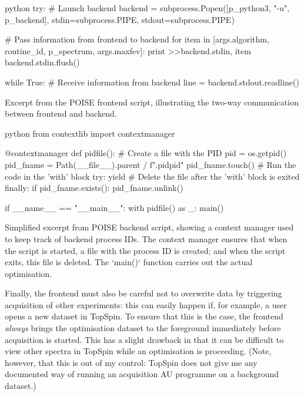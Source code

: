 \begin{mylisting}[htb]
\begin{tcbminted}{python}
try:
    # Launch backend
    backend = subprocess.Popen([p_python3, "-u", p_backend],
                               stdin=subprocess.PIPE,
                               stdout=subprocess.PIPE)

    # Pass information from frontend to backend
    for item in [args.algorithm, routine_id, p_spectrum, args.maxfev]:
        print >>backend.stdin, item
    backend.stdin.flush()

    while True:
        # Receive information from backend
        line = backend.stdout.readline()
\end{tcbminted}
    \caption[Communication between frontend and backend in POISE]{Excerpt from the POISE frontend script, illustrating the two-way communication between frontend and backend.}
    \label{lst:poise_communication}
\end{mylisting}

\begin{mylisting}[htb]
\begin{tcbminted}{python}
from contextlib import contextmanager

@contextmanager
def pidfile():
    # Create a file with the PID
    pid = os.getpid()
    pid_fname = Path(__file__).parent / f".pid{pid}"
    pid_fname.touch()
    # Run the code in the 'with' block
    try:
        yield
    # Delete the file after the 'with' block is exited
    finally:
        if pid_fname.exists():
            pid_fname.unlink()

if __name__ == "__main__":
    with pidfile() as _:
        main()
\end{tcbminted}
    \caption[Context manager to keep track of backend process IDs]{Simplified excerpt from POISE backend script, showing a context manager used to keep track of backend process IDs. The context manager ensures that when the script is started, a file with the process ID is created; and when the script exits, this file is deleted. The `main()` function carries out the actual optimisation.}
    \label{lst:poise_backendpid}
\end{mylisting}

Finally, the frontend must also be careful not to overwrite data by triggering acquisition of other experiments: this can easily happen if, for example, a user opens a new dataset in TopSpin.
To ensure that this is the case, the frontend \textit{always} brings the optimisation dataset to the foreground immediately before acquisition is started.
This has a slight drawback in that it can be difficult to view other spectra in TopSpin while an optimisation is proceeding.
(Note, however, that this is out of my control: TopSpin does not give me any documented way of running an acquisition AU programme on a background dataset.)
